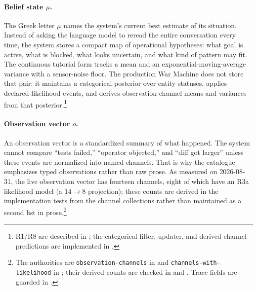 \paragraph{Belief state $\mu$.} The Greek letter $\mu$ names the system's current best estimate of its situation.  Instead of asking the language model to reread the entire conversation every time, the system stores a compact map of operational hypotheses: what goal is active, what is blocked, what looks uncertain, and what kind of pattern may fit.  The continuous tutorial form tracks a mean and an exponential-moving-average variance with a sensor-noise floor. The production War Machine does not store that pair: it maintains a categorical posterior over entity statuses, applies declared likelihood events, and derives observation-channel means and variances from that posterior.\footnote{R1/R8 are described in ; the categorical filter, updater, and derived channel predictions are implemented in .}

\paragraph{Observation vector $o$.} An observation vector is a standardized summary of what happened.  The system cannot compare ``tests failed,'' ``operator objected,'' and ``diff got larger'' unless these events are normalized into named channels.  That is why the catalogue emphasizes typed observations rather than raw prose.  As measured on 2026-08-31, the live observation vector has fourteen channels, eight of which have an R3a likelihood model (a $14\to8$ projection); these counts are derived in the implementation tests from the channel collections rather than maintained as a second list in prose.\footnote{The authorities are \texttt{observation-channels} in  and \texttt{channels-with-likelihood} in ; their derived counts are checked in  and . Trace fields are guarded in .}

